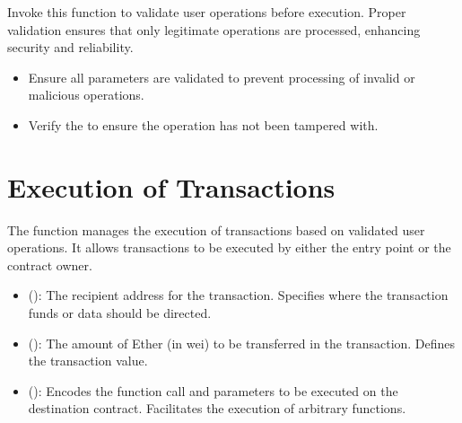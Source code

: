 \documentclass[a4paper,10pt,english]{sphinxmanual}
\begin{document}
\sphinxAtStartPar
{}

\sphinxAtStartPar
Invoke this function to validate user operations before execution. Proper validation ensures that only legitimate operations are processed, enhancing security and reliability.

\sphinxAtStartPar
{}
\begin{itemize}
\item {} 
\sphinxAtStartPar
{} Ensure all parameters are validated to prevent processing of invalid or malicious operations.

\item {} 
\sphinxAtStartPar
{} Verify the  to ensure the operation has not been tampered with.

\end{itemize}


\section{Execution of Transactions}
\label{\detokenize{docs_minimal_account_abstraction:execution-of-transactions}}
\sphinxAtStartPar
The  function manages the execution of transactions based on validated user operations. It allows transactions to be executed by either the entry point or the contract owner.

\begin{sphinxVerbatim}[commandchars=\\\{\}]
\end{sphinxVerbatim}

\sphinxAtStartPar
{}
\begin{itemize}
\item {} 
\sphinxAtStartPar
{} ():
The recipient address for the transaction. Specifies where the transaction funds or data should be directed.

\item {} 
\sphinxAtStartPar
{} ():
The amount of Ether (in wei) to be transferred in the transaction. Defines the transaction value.

\item {} 
\sphinxAtStartPar
{} ():
Encodes the function call and parameters to be executed on the destination contract. Facilitates the execution of arbitrary functions.

\end{itemize}
\end{document}
